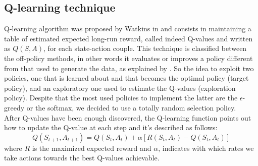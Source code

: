 \documentclass[conference,10pt]{IEEEtran}
\begin{document}
\subsection{Q-learning technique}
Q-learning algorithm was proposed by Watkins in \cite{watkins1992q} and consists in maintaining a table of estimated expected long-run reward, called indeed Q-values and written as $Q(S,A)$, for each state-action couple. This technique is classified between the off-policy methods, in other words it evaluates or improves a policy different from that used to generate the data, as explained by \cite{sutton1998reinforcement}. So the idea to exploit two policies, one that is learned about and that becomes the optimal policy (target policy), and an exploratory one used to estimate the Q-values (exploration policy). Despite that the most used policies to implement the latter are the $\epsilon$-greedy or the softmax, we decided to use a totally random selection policy. \\
After Q-values have been enough discovered, the Q-learning function points out how to update the Q-value at each step and it's described as follows:
\begin{equation*}
Q(S_{t+1},A_{t+1})=Q(S_{t},A_{t})+\alpha[R(S_{t},A_{t})-Q(S_{t},A_{t})]
\end{equation*}
where $ R  $ is the maximized expected reward and $\alpha$, indicates with which rates we take actions towards the best Q-values achievable.
\end{document}
